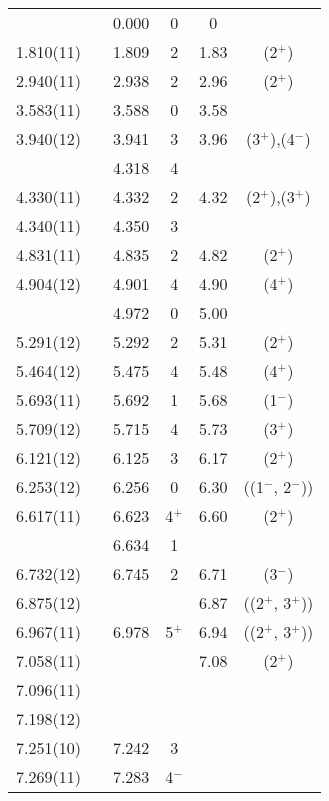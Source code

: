 \begin{center}
\begin{longtable}{cc cc cc}
  &   & 0.000 & 0 & 0 &   \\
1.810(11)   &   & 1.809 & 2 & 1.83  & (2$^+$)                 \\
2.940(11)   &   & 2.938 & 2 & 2.96  & (2$^+$)                 \\
3.583(11)   &   & 3.588 & 0 & 3.58  &                         \\
3.940(12)   &   & 3.941 & 3 & 3.96  & (3$^+$),(4$^-$)         \\
  &   & 4.318 & 4 &   &   \\
4.330(11)   &   & 4.332 & 2 & 4.32  & (2$^+$),(3$^+$)         \\
4.340(11)   &   & 4.350 & 3 &   &                         \\
4.831(11)   &   & 4.835 & 2 & 4.82  & (2$^+$)                 \\
4.904(12)   &   & 4.901 & 4 & 4.90  & (4$^+$)                 \\
  &   & 4.972 & 0 & 5.00  &                         \\
5.291(12)   &   & 5.292 & 2 & 5.31  & (2$^+$)                 \\
5.464(12)   &   & 5.475 & 4 & 5.48  & (4$^+$)                 \\
5.693(11)   &   & 5.692 & 1 & 5.68  & (1$^-$)                 \\
5.709(12)   &   & 5.715 & 4 & 5.73  & (3$^+$)                 \\
6.121(12)   &   & 6.125 & 3 & 6.17  & (2$^+$)                 \\
6.253(12)   &   & 6.256 & 0 & 6.30  & ((1$^-$, 2$^-$))        \\
6.617(11)   &   & 6.623 & 4$^+$ & 6.60  & (2$^+$)                 \\
  &   & 6.634 & 1 &   &   \\
6.732(12)   &   & 6.745 & 2 & 6.71  & (3$^-$)                 \\
6.875(12)   &   &   &   & 6.87  & ((2$^+$, 3$^+$))        \\
6.967(11)   &   & 6.978 & 5$^+$   & 6.94  & ((2$^+$, 3$^+$))        \\
7.058(11)   &   &   &   & 7.08  & (2$^+$)                 \\
7.096(11)   &   &   &   &   &   \\
7.198(12)   &   &   &   &   &   \\
7.251(10)   &   & 7.242 & 3 &   &   \\
7.269(11)   &   & 7.283 & 4$^-$ &   &   \\

\end{longtable}
\end{center}
